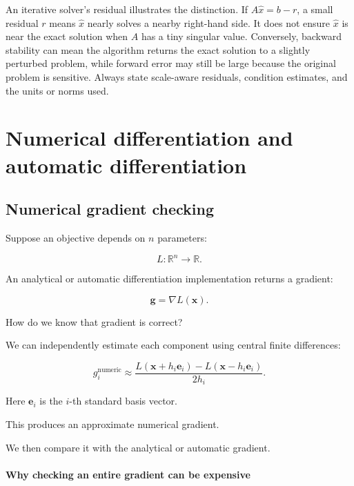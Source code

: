 An iterative solver's residual illustrates the distinction. If \(A\hat x=b-r\), a small residual \(r\) means \(\hat x\) nearly solves a nearby right-hand side. It does not ensure \(\hat x\) is near the exact solution when \(A\) has a tiny singular value. Conversely, backward stability can mean the algorithm returns the exact solution to a slightly perturbed problem, while forward error may still be large because the original problem is sensitive. Always state scale-aware residuals, condition estimates, and the units or norms used.

\section{Numerical differentiation and automatic differentiation}\label{02-foundations-ii-ch022-numerical-differentiation-and-automatic-differentiation}

\subsection{Numerical gradient checking}\label{02-foundations-ii-ch022-numerical-gradient-checking}

Suppose an objective depends on \(n\) parameters:

\[
L:\mathbb R^n\rightarrow\mathbb R.
\]

An analytical or automatic differentiation implementation returns a gradient:

\[
\mathbf g= \nabla L(\mathbf x).
\]

How do we know that gradient is correct?

We can independently estimate each component using central finite differences:

\[
\boxed{ g_i^{\mathrm{numeric}} \approx \frac{ L(\mathbf x+h_i\mathbf e_i)- L(\mathbf x-h_i\mathbf e_i) }{2h_i} }.
\]

Here \(\mathbf e_i\) is the \(i\)-th standard basis vector.

This produces an approximate numerical gradient.

We then compare it with the analytical or automatic gradient.

\paragraph{Why checking an entire gradient can be expensive}\label{02-foundations-ii-ch022-why-checking-an-entire-gradient-can-be-expensive}

